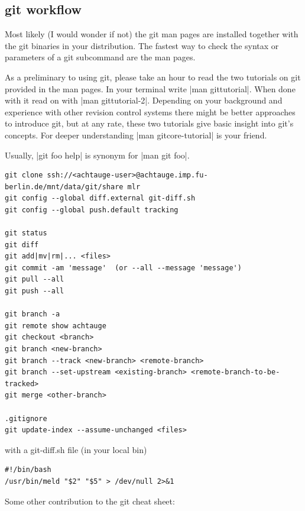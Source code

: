 \subsection{git workflow}\label{secGit}

Most likely (I would wonder if not) the git man pages are installed
together with the git binaries in your distribution. The fastest way to
check the syntax or parameters of a git subcommand are the man pages. 

As a preliminary to using git, please take an hour to read the two
tutorials on git provided in the man pages. In your terminal write
|man gittutorial|. When done with it read on with %
%
|man gittutorial-2|. Depending on your background and experience
with other revision control systems there might be better approaches to
introduce git, but at any rate, these two tutorials give basic
insight into git's concepts. For deeper understanding %
%
|man gitcore-tutorial| is your friend.

Usually, |git foo help| is synonym for |man git foo|.

\begin{code}
\begin{verbatim}
git clone ssh://<achtauge-user>@achtauge.imp.fu-berlin.de/mnt/data/git/share mlr
git config --global diff.external git-diff.sh
git config --global push.default tracking

git status
git diff
git add|mv|rm|... <files>
git commit -am 'message'  (or --all --message 'message')
git pull --all
git push --all

git branch -a
git remote show achtauge
git checkout <branch>
git branch <new-branch>
git branch --track <new-branch> <remote-branch>
git branch --set-upstream <existing-branch> <remote-branch-to-be-tracked>
git merge <other-branch>

.gitignore
git update-index --assume-unchanged <files>
\end{verbatim}
\end{code}

with a git-diff.sh file (in your local bin)
\begin{code}
\begin{verbatim}
#!/bin/bash
/usr/bin/meld "$2" "$5" > /dev/null 2>&1
\end{verbatim}
\end{code}

Some other contribution to the git cheat sheet:



